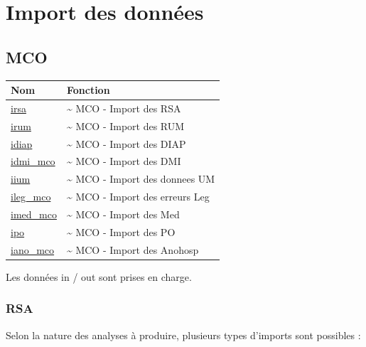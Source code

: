 \documentclass[]{book}
\begin{document}
\chapter{Import des données}\label{import-des-donnees}

\section{MCO}\label{mco}

\begin{longtable}[]{@{}ll@{}}
\toprule
Nom & Fonction\tabularnewline
\midrule
\endhead
\href{https://github.com/IM-APHP/pmeasyr/tree/master/Rd_md/irsa.Rmd}{irsa}
& \textasciitilde{} MCO - Import des RSA\tabularnewline
\href{https://github.com/IM-APHP/pmeasyr/tree/master/Rd_md/irum.Rmd}{irum}
& \textasciitilde{} MCO - Import des RUM\tabularnewline
\href{https://github.com/IM-APHP/pmeasyr/tree/master/Rd_md/idiap.Rmd}{idiap}
& \textasciitilde{} MCO - Import des DIAP\tabularnewline
\href{https://github.com/IM-APHP/pmeasyr/tree/master/Rd_md/idmi_mco.Rmd}{idmi\_mco}
& \textasciitilde{} MCO - Import des DMI\tabularnewline
\href{https://github.com/IM-APHP/pmeasyr/tree/master/Rd_md/iium.Rmd}{iium}
& \textasciitilde{} MCO - Import des donnees UM\tabularnewline
\href{https://github.com/IM-APHP/pmeasyr/tree/master/Rd_md/ileg_mco.Rmd}{ileg\_mco}
& \textasciitilde{} MCO - Import des erreurs Leg\tabularnewline
\href{https://github.com/IM-APHP/pmeasyr/tree/master/Rd_md/imed_mco.Rmd}{imed\_mco}
& \textasciitilde{} MCO - Import des Med\tabularnewline
\href{https://github.com/IM-APHP/pmeasyr/tree/master/Rd_md/ipo.Rmd}{ipo}
& \textasciitilde{} MCO - Import des PO\tabularnewline
\href{https://github.com/IM-APHP/pmeasyr/tree/master/Rd_md/iano_mco.Rmd}{iano\_mco}
& \textasciitilde{} MCO - Import des Anohosp\tabularnewline
\bottomrule
\end{longtable}

Les données in / out sont prises en charge.

\subsection{RSA}\label{rsa}

Selon la nature des analyses à produire, plusieurs types d'imports sont
possibles :
\end{document}
